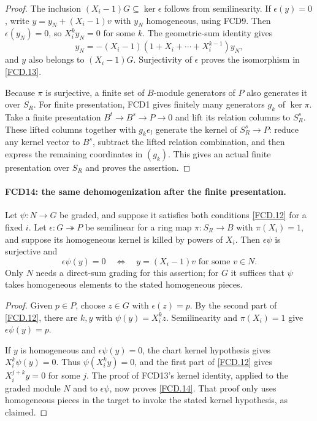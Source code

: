 \documentclass[11pt,a4paper]{article}
\numberwithin{equation}{section}
\theoremstyle{remark}\newtheorem{remark}[theorem]{Remark}
\begin{document}
\begin{proof}
The inclusion $(X_i-1)G\subseteq\ker\epsilon$ follows from
semilinearity.  If $\epsilon(y)=0$, write
$y=y_N+(X_i-1)v$ with $y_N$ homogeneous, using FCD9.
Then $\epsilon(y_N)=0$, so $X_i^ky_N=0$ for some $k$.
The geometric-sum identity gives
\[
 y_N=-(X_i-1)(1+X_i+\cdots+X_i^{k-1})y_N,
\]
and $y$ also belongs to $(X_i-1)G$.  Surjectivity of
$\epsilon$ proves the isomorphism in \eqref{FCD.13}.

Because $\pi$ is surjective, a finite set of $B$-module generators
of $P$ also generates it over $S_R$.  For finite presentation,
FCD1 gives finitely many generators $g_k$ of $\ker\pi$.
Take a finite presentation $B^t\to B^s\to P\to0$ and lift its
relation columns to $S_R^s$.  These lifted columns together with
$g_ke_l$ generate the kernel of $S_R^s\to P$: reduce any
kernel vector to $B^s$, subtract the lifted relation combination,
and then express the remaining coordinates in $(g_k)$.
This gives an actual finite presentation over $S_R$ and proves
the assertion.
\end{proof}

\paragraph{FCD14: the same dehomogenization after the finite presentation.}
\label{claim:FCD14}
Let $\psi:N\to G$ be graded, and suppose it satisfies both
conditions \eqref{FCD.12} for a fixed $i$.  Let
$\epsilon:G\twoheadrightarrow P$ be semilinear for a ring map
$\pi:S_R\to B$ with $\pi(X_i)=1$, and suppose its homogeneous
kernel is killed by powers of $X_i$.  Then $\epsilon\psi$ is
surjective and
\[
 \epsilon\psi(y)=0\quad\Longleftrightarrow\quad
 y=(X_i-1)v\text{ for some }v\in N.                 \tag{FCD.14}\label{FCD.14}
\]
Only $N$ needs a direct-sum grading for this assertion; for $G$
it suffices that $\psi$ takes homogeneous elements to the stated
homogeneous pieces.

\begin{proof}
Given $p\in P$, choose $z\in G$ with $\epsilon(z)=p$.
By the second part of \eqref{FCD.12}, there are $k,y$ with
$\psi(y)=X_i^kz$.  Semilinearity and $\pi(X_i)=1$ give
$\epsilon\psi(y)=p$.

If $y$ is homogeneous and $\epsilon\psi(y)=0$, the chart
kernel hypothesis gives $X_i^k\psi(y)=0$.
Thus $\psi(X_i^ky)=0$, and the first part of
\eqref{FCD.12} gives $X_i^{j+k}y=0$ for some $j$.
The proof of FCD13's kernel identity, applied to the graded
module $N$ and to $\epsilon\psi$, now proves
\eqref{FCD.14}.  That proof only uses homogeneous pieces in
the target to invoke the stated kernel hypothesis, as claimed.
\end{proof}
\end{document}
